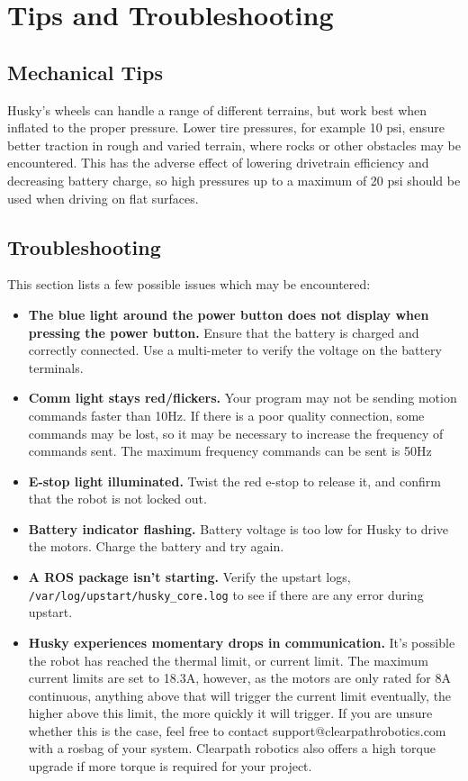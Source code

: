 \documentclass[]{clearpath-latex/clearpath-manual}
\begin{document}
\section{Tips and Troubleshooting}

\subsection{Mechanical Tips}
Husky’s wheels can handle a range of different terrains, but work best when inflated to the proper pressure. 
Lower tire pressures, for example 10 psi, ensure better traction in rough and varied terrain, where rocks or 
other obstacles may be encountered. This has the adverse effect of lowering drivetrain efficiency and decreasing 
battery charge, so high pressures up to a maximum of 20 psi should be used when driving on flat surfaces. 

\subsection{Troubleshooting}

This section lists a few possible issues which may be encountered:

\begin{itemize}
	\item \textbf{The blue light around the power button does not display when pressing the power button.} Ensure that the battery is charged and correctly connected. Use a multi-meter to verify the voltage on the battery terminals.
	\item \textbf{Comm light stays red/flickers.} Your program may not be sending motion commands faster than 10Hz. If there is a poor quality connection, some commands may be lost, so it may be necessary to increase the frequency of commands sent. The maximum frequency commands can be sent is 50Hz
	\item \textbf{E-stop light illuminated.} Twist the red e-stop to release it, and confirm that the robot is not locked out.
	\item \textbf{Battery indicator flashing.} Battery voltage is too low for Husky to drive the motors. Charge the battery and try again.
	\item \textbf{A ROS package isn't starting.} Verify the upstart logs, \lstinline{/var/log/upstart/husky_core.log} to see if there are any error during upstart.
	\item \textbf{Husky experiences momentary drops in communication.} It's possible the robot has reached the thermal limit, or current limit. The maximum current limits are set to 18.3A, however, as  the motors are only rated for 8A continuous, anything above that will trigger the current limit eventually, the higher above this limit, the more quickly it will trigger.  If you are unsure whether this is the case, feel free to contact support@clearpathrobotics.com with a rosbag of your system. Clearpath robotics also offers a high torque upgrade if more torque is required for your project.
\end{itemize}
	
\end{document}
